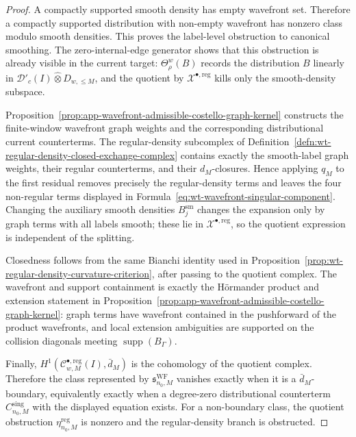 \begin{proof}
  A compactly supported smooth density has empty wavefront set.  Therefore
  a compactly supported distribution with non-empty wavefront has nonzero
  class modulo smooth densities.  This proves the
  label-level obstruction to canonical smoothing.  The zero-internal-edge
  generator shows that this obstruction is already visible in the current
  target: \(\Theta^w_\rho(B)\) records the distribution \(B\) linearly in
  \(\mathcal D'_c(I)\widehat\otimes D_{w,\leq M}\), and the quotient by
  \(\mathcal X^{\bullet,\mathrm{reg}}\) kills only the smooth-density
  subspace.

  Proposition~\ref{prop:app-wavefront-admissible-costello-graph-kernel}
  constructs the finite-window wavefront graph weights and the
  corresponding distributional current counterterms.  The regular-density
  subcomplex of
  Definition~\ref{defn:wt-regular-density-closed-exchange-complex} contains
  exactly the smooth-label graph weights, their regular counterterms, and
  their \(d_M\)-closures.  Hence applying \(q_M\) to the first residual
  removes precisely the regular-density terms and leaves the four
  non-regular terms displayed in
  Formula~\eqref{eq:wt-wavefront-singular-component}.  Changing the auxiliary
  smooth densities \(B_j^{\mathrm{sm}}\) changes the expansion only by
  graph terms with all labels smooth; these lie in
  \(\mathcal X^{\bullet,\mathrm{reg}}\), so the quotient expression is
  independent of the splitting.

  Closedness follows from the same Bianchi identity used in
  Proposition~\ref{prop:wt-regular-density-curvature-criterion}, after
  passing to the quotient complex.  The wavefront and support containment
  is exactly the H\"ormander product and extension statement in
  Proposition~\ref{prop:app-wavefront-admissible-costello-graph-kernel}:
  graph terms have wavefront contained in the pushforward of the product
  wavefronts, and local extension ambiguities are supported on the
  collision diagonals meeting \(\operatorname{supp}(B_\Gamma)\).

  Finally,
  \(H^1(\mathcal C^{\bullet,\mathrm{reg}}_{w,M}(I),\bar d_M)\) is the
  cohomology of the quotient complex.  Therefore the class represented by
  \(\mathfrak s^{\mathrm{WF}}_{n_0,M}\) vanishes exactly when it is a
  \(\bar d_M\)-boundary, equivalently exactly when a degree-zero
  distributional counterterm \(C^{\mathrm{sing}}_{n_0,M}\) with the
  displayed equation exists.  For a non-boundary class, the quotient
  obstruction \(\eta^{\mathrm{reg}}_{n_0,M}\) is nonzero and the
  regular-density branch is obstructed.
\end{proof}


